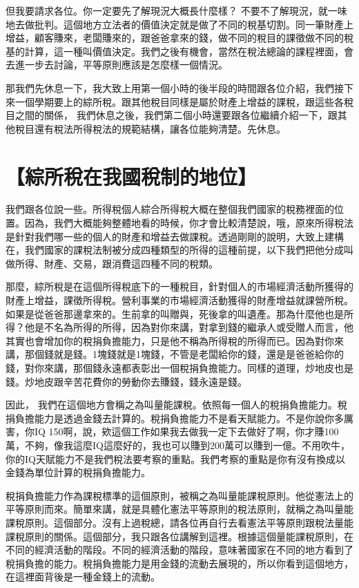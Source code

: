 \documentclass[oneside,sub3section]{ctexbook}
\begin{document}
但我要請求各位。你一定要先了解現況大概長什麼樣？ 不要不了解現況，就一味地去做批判。這個地方立法者的價值決定就是做了不同的稅基切割。同一筆財產上增益，顧客賺來，老闆賺來的，跟爸爸拿來的錢，做不同的稅目的課徵做不同的稅基的計算，這一種叫價值決定。我們之後有機會，當然在稅法總論的課程裡面，會去進一步去討論，平等原則應該是怎麼樣一個情況。

那我們先休息一下，我大致上用第一個小時的後半段的時間跟各位介紹，我們接下來一個學期要上的綜所稅。跟其他稅目同樣是屬於財產上增益的課稅，跟這些各稅目之間的關係，
我們休息之後，我們第二個小時還要跟各位繼續介紹一下，跟其他稅目還有稅法所得稅法的規範結構，讓各位能夠清楚。先休息。

\hypertarget{ux7d9cux6240ux7a05ux5728ux6211ux570bux7a05ux5236ux7684ux5730ux4f4d}{%
\section{【綜所稅在我國稅制的地位】}\label{ux7d9cux6240ux7a05ux5728ux6211ux570bux7a05ux5236ux7684ux5730ux4f4d}}

我們跟各位說一些。所得稅個人綜合所得稅大概在整個我們國家的稅務裡面的位置。因為，我們大概能夠整體地看的時候，你才會比較清楚說，哦，原來所得稅法是針對我們哪一些的個人的財產和增益去做課稅。透過剛剛的說明，大致上建構在，我們國家的課稅法制被分成四種類型的所得的這種前提，以下我們把他分成叫做所得、財產、交易，跟消費這四種不同的稅類。

那麼，綜所稅是在這個所得稅底下的一種稅目，針對個人的市場經濟活動所獲得的財產上增益，課徵所得稅。營利事業的市場經濟活動獲得的財產增益就課營所稅。如果是從爸爸那邊拿來的。生前拿的叫贈與，死後拿的叫遺產。那為什麼他也是所得？他是不名為所得的所得，因為對你來講，對拿到錢的繼承人或受贈人而言，他其實也會增加你的稅捐負擔能力，只是他不稱為所得稅的所得而已。因為對你來講，那個錢就是錢。1塊錢就是1塊錢，不管是老闆給你的錢，還是是爸爸給你的錢，對你來講，那個錢永遠都表彰出一個稅捐負擔能力。同樣的道理，炒地皮也是錢。炒地皮跟辛苦花費你的勞動你去賺錢，錢永遠是錢。

因此， 我們在這個地方會稱之為叫量能課稅。依照每一個人的稅捐負擔能力。稅捐負擔能力是透過金錢去計算的。稅捐負擔能力不是看天賦能力。不是你說你多厲害，你IQ 150啊，說，欸這個工作如果我去做我一定下去做好了啊，你才賺100萬，不夠，像我這麼IQ這麼好的，我也可以賺到200萬可以賺到一億。不用吹牛，你的IQ天賦能力不是我們稅法要考察的重點。我們考察的重點是你有沒有換成以金錢為單位計算的稅捐負擔能力。

稅捐負擔能力作為課稅標準的這個原則，被稱之為叫量能課稅原則。他從憲法上的平等原則而來。簡單來講，就是具體化憲法平等原則的稅法原則，就稱之為叫量能課稅原則。這個部分。沒有上過稅總，請各位再自行去看憲法平等原則跟稅法量能課稅原則的關係。這個部分，我只跟各位講解到這裡。根據這個量能課稅原則，在不同的經濟活動的階段。不同的經濟活動的階段，意味著國家在不同的地方看到了稅捐負擔的能力。稅捐負擔能力是用金錢的流動去展現的，所以你看到這個地方，在這裡面背後是一種金錢上的流動。
\end{document}
